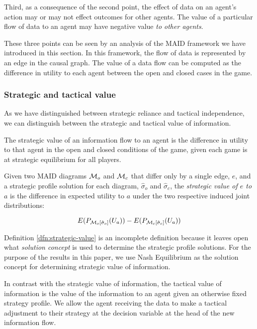 \documentclass[../thesis.tex]{subfiles}
\begin{document}
Third, as a consequence of the second point,
the effect of data on an agent's action may or may
not effect outcomes for other agents.
The value of a particular flow of data to an agent
may have negative value \emph{to other agents}.

These three points can be seen by an analysis of the MAID
framework we have introduced in this section.
In this framework, the flow of data is represented by
an edge in the causal graph.
The value of a data flow can be computed as the difference
in utility to each agent between the open and closed cases
in the game.

\subsubsection{Strategic and tactical value}

As we have distinguished between strategic reliance and
tactical independence, we can distinguish between the
strategic and tactical value of information.

The strategic value of an information flow to an agent
is the difference in utility to that agent in the open
and closed conditions of the game, given each game
is at strategic equilibrium for all players.

\begin{dfn}
  \label{dfn:strategic-value}
  Given two MAID diagrams $\mathcal{M}_{o}$ and $\mathcal{M}_{c}$
  that differ only by a single edge, $e$,
  and a strategic profile solution for each diagram, $\hat{\sigma}_{o}$
  and $\hat{\sigma}_{c}$, the \emph{strategic value of $e$ to $a$}
  is the difference in expected utility to $a$ under the
  two respective induced joint distributions:

  $$E(P_{\mathcal{M}_{o}[\hat{\sigma}_{o}]}(U_a)) - E(P_{\mathcal{M}_{c}[\hat{\sigma}_{c}]}(U_a))$$
\end{dfn}

Definition \ref{dfn:strategic-value} is an incomplete
definition because it leaves open what \textit{solution concept}
is used to determine the strategic profile solutions.
For the purpose of the results in this paper, we use
Nash Equilibrium as the solution concept for determining
strategic value of information.

In contrast with the strategic value of information,
the tactical value of information is the value of
the information to an agent given an otherwise fixed
strategy profile.
We allow the agent receiving the data to make a tactical
adjustment to their strategy at the decision variable
at the head of the new information flow.
\end{document}

